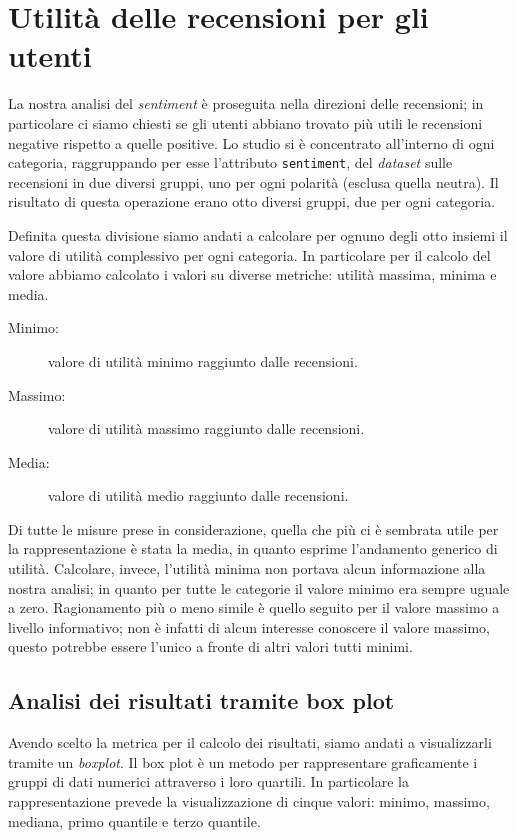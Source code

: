 		
	\section{Utilità delle recensioni per gli utenti}
		La nostra analisi del \textit{sentiment} è proseguita nella direzioni delle recensioni; in particolare ci siamo chiesti se gli utenti abbiano trovato più utili le recensioni negative rispetto a quelle positive. Lo studio si è concentrato all'interno di ogni categoria, raggruppando per esse l'attributo \verb|sentiment|, del \textit{dataset} sulle recensioni in due diversi gruppi, uno per ogni polarità (esclusa quella neutra). Il risultato di questa operazione erano otto diversi gruppi, due per ogni categoria. 
		
		Definita questa divisione siamo andati a calcolare per ognuno degli otto insiemi il valore di utilità complessivo per ogni categoria. In particolare per il calcolo del valore abbiamo calcolato i valori su diverse metriche: utilità massima, minima e media.
		
		\begin{description}
			\item[Minimo:] valore di utilità minimo raggiunto dalle recensioni.
			\item[Massimo:] valore di utilità massimo raggiunto dalle recensioni.
			\item[Media:] valore di utilità medio raggiunto dalle recensioni.
		\end{description}
	
		Di tutte le misure prese in considerazione, quella che più ci è sembrata utile per la rappresentazione è stata la media, in quanto esprime l'andamento generico di utilità. Calcolare, invece, l'utilità minima non portava alcun informazione alla nostra analisi; in quanto per tutte le categorie il valore minimo era sempre uguale a zero. Ragionamento più o meno simile è quello seguito per il valore massimo a livello informativo; non è infatti di alcun interesse conoscere il valore massimo, questo potrebbe essere l'unico a fronte di altri valori tutti minimi. 
		
		\subsection{Analisi dei risultati tramite box plot}
			Avendo scelto la metrica per il calcolo dei risultati, siamo andati a visualizzarli tramite un \textit{boxplot}. Il box plot è un metodo per rappresentare graficamente i gruppi di dati numerici attraverso i loro quartili. In particolare la rappresentazione prevede la visualizzazione di cinque valori: minimo, massimo, mediana, primo quantile e terzo quantile.
			
